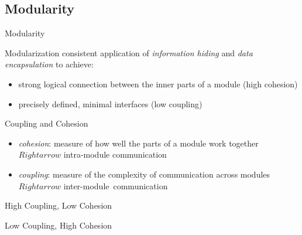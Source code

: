 \subsection{Modularity}
\begin{frame}{Modularity} %
	\begin{mycolumns}[widths={50,50},animation=none]
		\begin{definition}{Modularization}
			consistent application of \emph{information hiding} and \emph{data encapsulation} to achieve:
			\begin{itemize}
				\item strong logical connection between the inner parts of a module (high cohesion)
				\item precisely defined, minimal interfaces (low coupling)
			\end{itemize}						
		\end{definition}
		\pause
		\begin{definition}{Coupling and Cohesion}
			\begin{itemize}
				\item \emph{cohesion}: measure of how well the parts of a module work together\\ $Rightarrow$ intra-module communication
				\item \emph{coupling}: measure of the complexity of communication across modules\\ $Rightarrow$ inter-module~communication %
			\end{itemize}
		\end{definition}
	\mynextcolumn
		\vspace{-1cm}
		\begin{exampletight}{High Coupling, Low Cohesion}
			\centering
		\end{exampletight}
		\begin{exampletight}{Low Coupling, High Cohesion}
			\centering
		\end{exampletight}
	\end{mycolumns}
	\begin{mycolumns}[widths={50,50},animation=none]	
	\end{mycolumns}
\end{frame}

